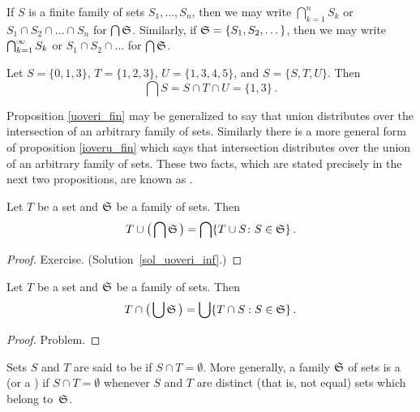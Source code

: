 \begin{notn} If $S$ is a finite family of sets $S_1,\dots,S_n$, then we may write
$\bigcap_{k=1}^n S_k$ or $S_1 \cap S_2 \cap \dots \cap S_n$ for $\bigcap\mathfrak{S}$.
Similarly, if $\mathfrak{S} = \{S_1,S_2,\dots\}$, then we may write
$\smash[t]{\bigcap_{k=1}^\infty S_k}$ or $S_1 \cap S_2 \cap \dots$ for $\bigcap\mathfrak{S}$.
\end{notn}


\begin{exam} Let $S = \{0,1,3\}$, $T = \{1,2,3\}$, $U = \{1,3,4,5\}$, and $S = \{S,T,U\}$.
Then
   \[ \bigcap S = S \cap T \cap U = \{1,3\}\,. \]
\end{exam}

Proposition \ref{uoveri_fin} may be generalized to say that union distributes over the
intersection of an arbitrary family of sets. Similarly there is a more general form of
proposition \ref{ioveru_fin} which says that intersection distributes over the union of an
arbitrary family of sets.  These two facts, which are stated precisely in the next two
propositions, are known as
.

\begin{prop}\label{uoveri_inf} Let $T$ be a set and $\mathfrak{S}$ be a family of sets.  Then
   \[ T \cup \bigl(\,\bigcap\mathfrak{S}\,\bigr) = \bigcap\{T \cup S \colon  S \in \mathfrak{S}\}\,. \]
\end{prop}

\begin{proof} Exercise.  (Solution~\ref{sol_uoveri_inf}.) \ns \end{proof}

\begin{prop}\label{ioveru_inf}  Let $T$ be a set and $\mathfrak{S}$ be a family of sets.  Then
   \[ T \cap \bigl(\,\bigcup \mathfrak{S}\,\bigr) = \bigcup\{T \cap S: S \in \mathfrak{S}\}\,. \]
\end{prop}

\begin{proof} Problem. \ns \end{proof}

\begin{defn} Sets $S$ and $T$ are said to be
 if $S \cap T = \emptyset$.  More generally, a family $\mathfrak{S}$ of sets is a
 (or a
) if $S \cap T = \emptyset$ whenever $S$ and $T$ are
distinct (that is, not equal) sets which belong to~$\mathfrak{S}$.
\end{defn}

